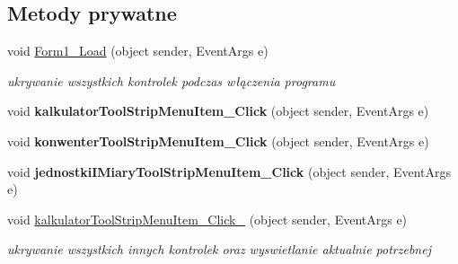 \subsection*{Metody prywatne}
\begin{DoxyCompactItemize}
\item 
\mbox{\label{classkalku__all__in__one_1_1_form1_ac4e98dfa5638e69ecf3c6b2a62b028d0}} 
void \mbox{\hyperlink{classkalku__all__in__one_1_1_form1_ac4e98dfa5638e69ecf3c6b2a62b028d0}{Form1\+\_\+\+Load}} (object sender, Event\+Args e)
\begin{DoxyCompactList}\small\item\em ukrywanie wszystkich kontrolek podczas włączenia programu \end{DoxyCompactList}\item 
\mbox{\label{classkalku__all__in__one_1_1_form1_a23747a891c933d3e3e299488840a672f}} 
void {\bfseries kalkulator\+Tool\+Strip\+Menu\+Item\+\_\+\+Click} (object sender, Event\+Args e)
\item 
\mbox{\label{classkalku__all__in__one_1_1_form1_a52e79899404e8fabb32a824363c5ec3e}} 
void {\bfseries konwenter\+Tool\+Strip\+Menu\+Item\+\_\+\+Click} (object sender, Event\+Args e)
\item 
\mbox{\label{classkalku__all__in__one_1_1_form1_a3376ec93706f732e4dabed50611cfa21}} 
void {\bfseries jednostki\+I\+Miary\+Tool\+Strip\+Menu\+Item\+\_\+\+Click} (object sender, Event\+Args e)
\item 
\mbox{\label{classkalku__all__in__one_1_1_form1_a4d2d072d54aa2cc5a8c5d7b0dd3c325d}} 
void \mbox{\hyperlink{classkalku__all__in__one_1_1_form1_a4d2d072d54aa2cc5a8c5d7b0dd3c325d}{kalkulator\+Tool\+Strip\+Menu\+Item\+\_\+\+Click\+\_}} (object sender, Event\+Args e)
\begin{DoxyCompactList}\small\item\em ukrywanie wszystkich innych kontrolek oraz wyswietlanie aktualnie potrzebnej \end{DoxyCompactList}\item 
\mbox{\label{classkalku__all__in__one_1_1_form1_a05c362c039f2c6613539dd2dbc84fce0}} 

\end{DoxyCompactItemize}
